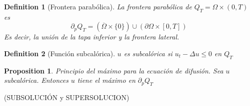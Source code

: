 \documentclass[leqno]{article}
\newtheorem*{proposition}{Proposition}
\newtheorem*{definition}{Definition}
\begin{document}
\begin{definition}[Frontera parabólica]
La frontera parabólica de $Q_T = \Omega \times (0,T)$ es 
\[
  \partial_pQ_T = (\overline{\Omega }\times \{0\})\cup (\partial \Omega \times [0,T])
\] 
Es decir, la unión de la tapa inferior y la frontera lateral.
\end{definition}

\begin{definition}[Función subcalórica] $u$ es subcalórica si $u_t-\Delta u\le 0$ en $Q_T$
\end{definition}

\begin{proposition} Principio del máximo para la ecuación de difusión. Sea $u$ subcalórica. Entonces $u$ tiene el máximo en $\partial_pQ_T$
\end{proposition}

(SUBSOLUCIÓN y SUPERSOLUCION)
\end{document}
